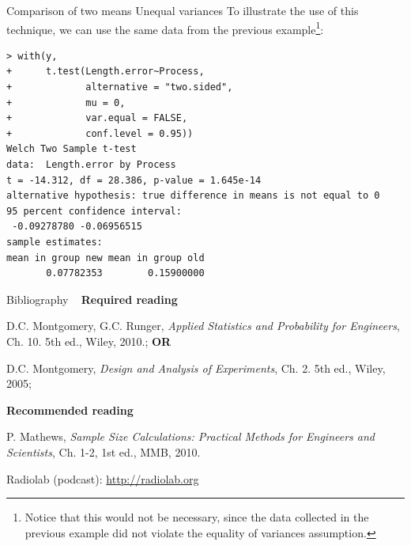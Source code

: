 \documentclass[t]{beamer}
\begin{document}

\begin{ftstf}
{Comparison of two means}
{Unequal variances}
To illustrate the use of this technique, we can use the same data from the previous example\footnote[2]{Notice that this would not be necessary, since the data collected in the previous example did not violate the equality of variances assumption.}:
\vhalf
\begin{Verbatim}[fontsize=\scriptsize]
> with(y,
+      t.test(Length.error~Process,
+             alternative = "two.sided",
+             mu = 0,
+             var.equal = FALSE,
+             conf.level = 0.95))
Welch Two Sample t-test
data:  Length.error by Process
t = -14.312, df = 28.386, p-value = 1.645e-14
alternative hypothesis: true difference in means is not equal to 0
95 percent confidence interval:
 -0.09278780 -0.06956515
sample estimates:
mean in group new mean in group old 
       0.07782353        0.15900000 
\end{Verbatim}
\vone
\end{ftstf}









\begin{ftst}
{Bibliography}
{\ }
\scriptsize
\textbf{Required reading}

\benums D.C. Montgomery, G.C. Runger, \textit{Applied Statistics and Probability for Engineers}, Ch. 10. 5th ed., Wiley, 2010.; \textbf{OR}
\item D.C. Montgomery, \textit{Design and Analysis of Experiments}, Ch. 2. 5th ed., Wiley, 2005;
\eenum

\textbf{Recommended reading}

\benums P. Mathews, \textit{Sample Size Calculations: Practical Methods for Engineers and Scientists}, Ch. 1-2, 1st ed., MMB, 2010.
\item Radiolab (podcast): \url{http://radiolab.org}
\eenum
\end{ftst}

\end{document}
